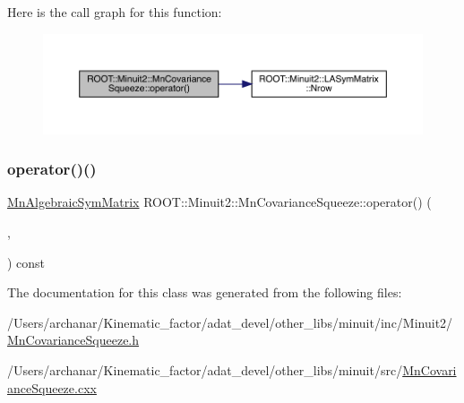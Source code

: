 Here is the call graph for this function\+:\nopagebreak
\begin{figure}[H]
\begin{center}
\leavevmode
\includegraphics[width=350pt]{dc/d44/classROOT_1_1Minuit2_1_1MnCovarianceSqueeze_a3271676361fc2c88dad2037f40479fab_cgraph}
\end{center}
\end{figure}
\mbox{\label{classROOT_1_1Minuit2_1_1MnCovarianceSqueeze_a3271676361fc2c88dad2037f40479fab}} 
\subsubsection{\texorpdfstring{operator()()}{operator()()}\hspace{0.1cm}{\footnotesize\ttfamily [6/6]}}
{\footnotesize\ttfamily \mbox{\hyperlink{namespaceROOT_1_1Minuit2_a9e74ad97f5537a2e80e52b04d98ecc6e}{Mn\+Algebraic\+Sym\+Matrix}} R\+O\+O\+T\+::\+Minuit2\+::\+Mn\+Covariance\+Squeeze\+::operator() (\begin{DoxyParamCaption}\item[{const \mbox{\hyperlink{namespaceROOT_1_1Minuit2_a9e74ad97f5537a2e80e52b04d98ecc6e}{Mn\+Algebraic\+Sym\+Matrix}} \&}]{,  }\item[{unsigned int}]{ }\end{DoxyParamCaption}) const}



The documentation for this class was generated from the following files\+:\begin{DoxyCompactItemize}
\item 
/\+Users/archanar/\+Kinematic\+\_\+factor/adat\+\_\+devel/other\+\_\+libs/minuit/inc/\+Minuit2/\mbox{\hyperlink{other__libs_2minuit_2inc_2Minuit2_2MnCovarianceSqueeze_8h}{Mn\+Covariance\+Squeeze.\+h}}\item 
/\+Users/archanar/\+Kinematic\+\_\+factor/adat\+\_\+devel/other\+\_\+libs/minuit/src/\mbox{\hyperlink{MnCovarianceSqueeze_8cxx}{Mn\+Covariance\+Squeeze.\+cxx}}\end{DoxyCompactItemize}
